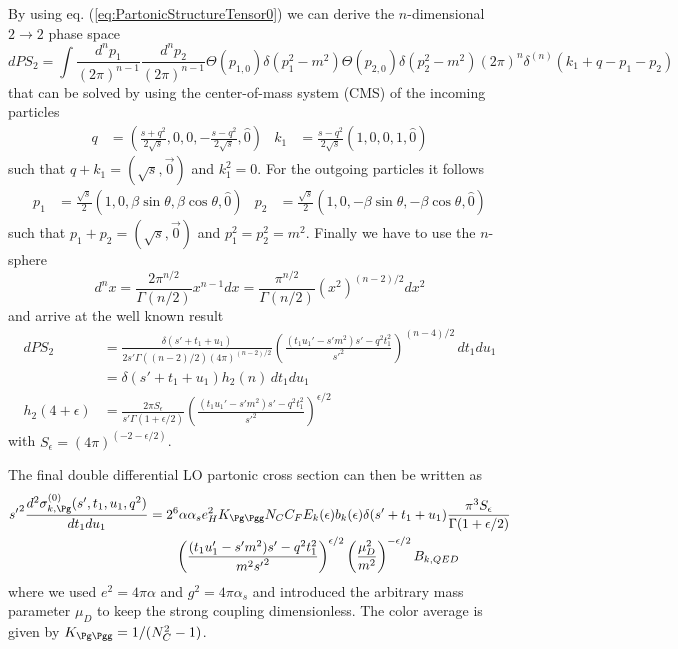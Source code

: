 By using eq. (\ref{eq:PartonicStructureTensor0}) we can derive the $n$-dimensional $2\rightarrow 2$ phase space
\begin{equation}
dPS_2 = \!\int\!\!\frac{d^{n}p_1}{(2\pi)^{n-1}}\frac{d^{n}p_2}{(2\pi)^{n-1}}\Theta(p_{1,0})\delta(p_1^2-m^2)\Theta(p_{2,0})\delta(p_2^2-m^2)(2\pi)^n\delta^{(n)}(k_1+q-p_1-p_2)
\end{equation}
that can be solved by using the center-of-mass system (CMS) of the incoming particles\cite{Bojak:2000eu}
\begin{align}
q &= \left(\frac {s+q^2}{2\sqrt s},0,0,-\frac{s-q^2}{2\sqrt s},\hat 0\right) &
k_1 &= \frac {s-q^2}{2\sqrt s}\left(1,0,0,1,\hat 0\right)
\end{align}
such that $q+k_1=(\sqrt s,\vec 0)$ and $k_1^2 = 0$. For the outgoing particles it follows
\begin{align}
p_1 &= \frac{\sqrt s} 2 \left(1,0,\beta\sin\theta,\beta\cos\theta,\hat 0\right)&
p_2 &= \frac{\sqrt s} 2 \left(1,0,-\beta\sin\theta,-\beta\cos\theta,\hat 0\right)
\end{align}
such that $p_1+p_2 = (\sqrt s,\vec 0)$ and $p_1^2 = p_2^2=m^2$. Finally we have to use the $n$-sphere
\begin{equation}
d^nx = \frac{2\pi^{n/2}}{\Gamma(n/2)}x^{n-1} dx= \frac{\pi^{n/2}}{\Gamma(n/2)}(x^2)^{(n-2)/2} dx^2
\end{equation}
and arrive at the well known result\cite{Laenen1993162}
\begin{align}
dPS_2 &= \frac {\delta(s'+t_1+u_1)} {2s'\Gamma((n-2)/2)(4\pi)^{(n-2)/2}}\left(\frac{(t_1u_1'-s'm^2)s' - q^2t_1^2}{s'^2}\right)^{(n-4)/2}\,dt_1du_1\\
 &= \delta(s'+t_1+u_1) h_2(n)\,dt_1 du_1\\
h_2(4+\epsilon) &= \frac {2\pi S_\epsilon} {s'\Gamma(1+\epsilon/2)}\left(\frac{(t_1u_1'-s'm^2)s' - q^2t_1^2}{s'^2}\right)^{\epsilon/2}
\end{align}
with $S_\epsilon = (4\pi)^{(-2-\epsilon/2)}$.

The final double differential LO partonic cross section can then be written as
\begin{align}
{s'}^2\frac{d^2\sigma_{k,\Pg}^{(0)}(s',t_1,u_1,q^2)}{dt_1du_1} &= 2^6\alpha\alpha_s e_H^2 K_{\Pg\Pgg}N_CC_F E_k(\epsilon) b_k(\epsilon)\delta(s'+t_1+u_1) \frac{\pi^3S_\epsilon}{\Gamma(1+\epsilon/2)}  \nonumber\\
 &\hspace{20pt} \left(\frac{(t_1u_1'-s'm^2)s' - q^2t_1^2}{m^2{s'}^2}\right)^{\epsilon/2}\left(\frac{\mu_D^2}{m^2}\right)^{-\epsilon/2} B_{k,QED}
\end{align}
where we used $e^2=4\pi\alpha$ and $g^2=4\pi\alpha_s$ and introduced the arbitrary mass parameter $\mu_D$ to keep the strong coupling dimensionless. The color average is given by $K_{\Pg\Pgg} = 1/(N_C^2-1)$.

